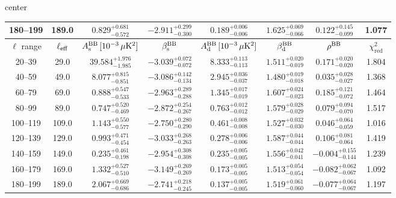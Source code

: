 \begin{table}[h]
\begin{adjustbox}{center}
\begin{tabular}{cccccccc}
180--199 & 189.0 & $0.829^{+0.681}_{-0.572}$ & $-2.911^{+0.299}_{-0.300}$ & $0.189^{+0.006}_{-0.006}$ & $1.625^{+0.069}_{-0.066}$ & $0.122^{+0.145}_{-0.099}$ & 1.077 \\
\midrule
$\ell$ range & $\ell_{\rm eff}$ & $A^{\rm BB}_{\rm s}\,[10^{-3}\,\mu\mathrm{K}^2]$ & $\beta^{\rm BB}_{\rm s}$ & $A^{\rm BB}_{\rm d}\,[10^{-3}\,\mu\mathrm{K}^2]$ & $\beta^{\rm BB}_{\rm d}$ & $\rho^{\rm BB}$ & $\chi^2_\mathrm{red}$ \\
\midrule
20--39 & 29.0 & $39.584^{+1.976}_{-1.985}$ & $-3.039^{+0.072}_{-0.072}$ & $8.333^{+0.113}_{-0.113}$ & $1.511^{+0.020}_{-0.019}$ & $0.171^{+0.020}_{-0.020}$ & 1.804 \\
40--59 & 49.0 & $8.077^{+0.815}_{-0.851}$ & $-3.086^{+0.142}_{-0.134}$ & $2.945^{+0.036}_{-0.037}$ & $1.480^{+0.019}_{-0.018}$ & $0.035^{+0.028}_{-0.027}$ & 1.368 \\
60--79 & 69.0 & $0.888^{+0.547}_{-0.533}$ & $-2.963^{+0.289}_{-0.288}$ & $1.345^{+0.017}_{-0.019}$ & $1.607^{+0.024}_{-0.023}$ & $0.185^{+0.121}_{-0.072}$ & 1.464 \\
80--99 & 89.0 & $0.747^{+0.520}_{-0.469}$ & $-2.872^{+0.254}_{-0.267}$ & $0.763^{+0.012}_{-0.012}$ & $1.579^{+0.028}_{-0.029}$ & $0.079^{+0.094}_{-0.070}$ & 1.517 \\
100--119 & 109.0 & $1.143^{+0.550}_{-0.577}$ & $-2.750^{+0.280}_{-0.290}$ & $0.461^{+0.008}_{-0.008}$ & $1.527^{+0.032}_{-0.030}$ & $0.046^{+0.064}_{-0.059}$ & 1.016 \\
120--139 & 129.0 & $0.993^{+0.471}_{-0.454}$ & $-3.033^{+0.268}_{-0.263}$ & $0.278^{+0.006}_{-0.006}$ & $1.587^{+0.044}_{-0.044}$ & $0.106^{+0.081}_{-0.064}$ & 1.419 \\
140--159 & 149.0 & $0.235^{+0.461}_{-0.198}$ & $-2.954^{+0.308}_{-0.308}$ & $0.235^{+0.005}_{-0.005}$ & $1.556^{+0.042}_{-0.041}$ & $-0.004^{+0.155}_{-0.144}$ & 1.239 \\
160--179 & 169.0 & $1.332^{+0.527}_{-0.510}$ & $-3.149^{+0.269}_{-0.269}$ & $0.173^{+0.005}_{-0.005}$ & $1.513^{+0.054}_{-0.054}$ & $-0.082^{+0.062}_{-0.067}$ & 1.092 \\
180--199 & 189.0 & $2.067^{+0.669}_{-0.686}$ & $-2.741^{+0.218}_{-0.245}$ & $0.137^{+0.005}_{-0.005}$ & $1.519^{+0.061}_{-0.060}$ & $-0.077^{+0.064}_{-0.067}$ & 1.197 \\
\bottomrule
\end{tabular}
\end{adjustbox}
\end{table}
